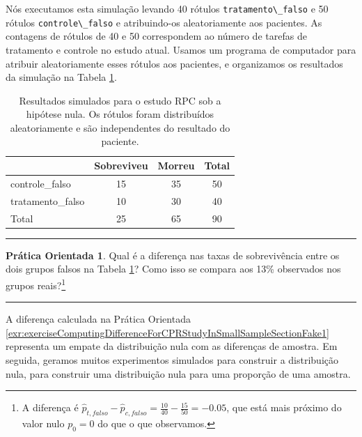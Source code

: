 \documentclass[
]{book}
\theoremstyle{definition}
\theoremstyle{definition}
\theoremstyle{definition}
\newtheorem{exercise}{Prática Orientada}[chapter]
\theoremstyle{definition}
\theoremstyle{remark}
\begin{document}
Nós executamos esta simulação levando 40 rótulos \texttt{tratamento\textbackslash{}\_falso} e 50 rótulos \texttt{controle\textbackslash{}\_falso} e atribuindo-os aleatoriamente aos pacientes. As contagens de rótulos de 40 e 50 correspondem ao número de tarefas de tratamento e controle no estudo atual. Usamos um programa de computador para atribuir aleatoriamente esses rótulos aos pacientes, e organizamos os resultados da simulação na Tabela \ref{tab:resultsForCPRStudyInSmallSampleSectionFake}.

\begin{table}

\caption{\label{tab:resultsForCPRStudyInSmallSampleSectionFake} Resultados simulados para o estudo RPC sob a hipótese nula. Os rótulos foram distribuídos aleatoriamente e são independentes do resultado do paciente.}
\centering
\begin{tabular}[t]{l|c|c|c}
\hline
  & Sobreviveu & Morreu & Total\\
\hline
controle\_falso & 15 & 35 & 50\\
\hline
tratamento\_falso & 10 & 30 & 40\\
\hline
Total & 25 & 65 & 90\\
\hline
\end{tabular}
\end{table}

\begin{center}\rule{0.5\linewidth}{0.5pt}\end{center}

\begin{exercise}
\protect\hypertarget{exr:exerciseComputingDifferenceForCPRStudyInSmallSampleSectionFake1}{}{\label{exr:exerciseComputingDifferenceForCPRStudyInSmallSampleSectionFake1} }Qual é a diferença nas taxas de sobrevivência entre os dois grupos falsos na Tabela \ref{tab:resultsForCPRStudyInSmallSampleSectionFake}? Como isso se compara aos 13\% observados nos grupos reais?\footnote{A diferença é \(\hat{p}_{t, falso} - \hat{p}_{c, falso} = \frac{10}{40} - \frac{15}{50} = -0.05\), que está mais próximo do valor nulo \(p_0 = 0\) do que o que observamos.}
\end{exercise}

\begin{center}\rule{0.5\linewidth}{0.5pt}\end{center}

A diferença calculada na Prática Orientada \ref{exr:exerciseComputingDifferenceForCPRStudyInSmallSampleSectionFake1} representa um empate da distribuição nula com as diferenças de amostra. Em seguida, geramos muitos experimentos simulados para construir a distribuição nula, para construir uma distribuição nula para uma proporção de uma amostra.
\end{document}
